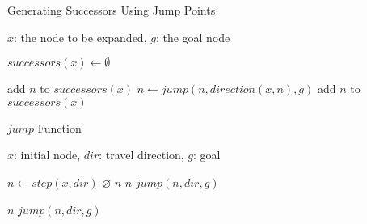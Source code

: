 \begin{algorithm}[b]
\caption{Generating Successors Using Jump Points}
\label{alg:successors}
\begin{algorithmic}[1]
\REQUIRE $x$: the node to be expanded, $g$: the goal node 

\STATE $successors(x) \leftarrow \emptyset$

\STATE add $n$ to $successors(x)$ 
\ELSE
\STATE $n \leftarrow jump(n, direction(x, n), g)$
\STATE add $n$ to $successors(x)$
\ENDIF
\ENDFOR

\end{algorithmic}
\end{algorithm}

\begin{algorithm}[b]
\caption{$jump$ Function}
\label{alg:jump}
\begin{algorithmic}[1]
\REQUIRE $x$: initial node, $dir$: travel direction, $g$: goal

\STATE $n \leftarrow step(x, dir)$
	\RETURN $\varnothing$
\ENDIF
{}
	\RETURN $n$
\ENDIF
{}
	\RETURN $n$
\ENDIF
{}
	\RETURN $jump(n, dir, g)$
\ENDIF

			\RETURN $n$
		\ENDIF
	\ENDIF
\ENDFOR
\RETURN $jump(n, dir, g)$
\end{algorithmic}
\end{algorithm}
